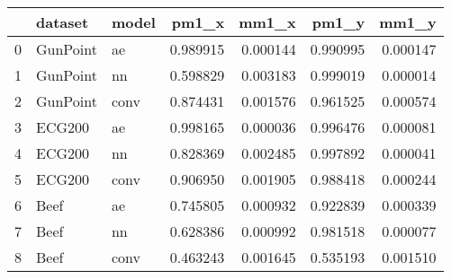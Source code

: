 \begin{tabular}{lllrrrr}
\toprule
{} &   dataset & model &     pm1\_x &     mm1\_x &     pm1\_y &     mm1\_y \\
\midrule
0 &  GunPoint &    ae &  0.989915 &  0.000144 &  0.990995 &  0.000147 \\
1 &  GunPoint &    nn &  0.598829 &  0.003183 &  0.999019 &  0.000014 \\
2 &  GunPoint &  conv &  0.874431 &  0.001576 &  0.961525 &  0.000574 \\
3 &    ECG200 &    ae &  0.998165 &  0.000036 &  0.996476 &  0.000081 \\
4 &    ECG200 &    nn &  0.828369 &  0.002485 &  0.997892 &  0.000041 \\
5 &    ECG200 &  conv &  0.906950 &  0.001905 &  0.988418 &  0.000244 \\
6 &      Beef &    ae &  0.745805 &  0.000932 &  0.922839 &  0.000339 \\
7 &      Beef &    nn &  0.628386 &  0.000992 &  0.981518 &  0.000077 \\
8 &      Beef &  conv &  0.463243 &  0.001645 &  0.535193 &  0.001510 \\
\bottomrule
\end{tabular}
